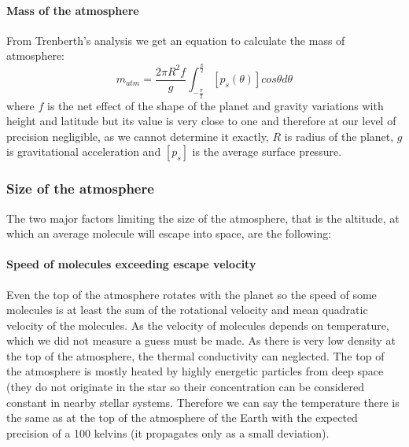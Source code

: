 \documentclass{cfp}
\begin{document}
\paragraph{Mass of the atmosphere}
From Trenberth's analysis \cite{Trenberth} we get an equation to calculate the mass of atmosphere:
\begin{equation}
m_{atm} = \frac{2\pi R^2 f}{g} \int_{-\frac{\pi}{2}}^{\frac{\pi}{2}} [p_s(\theta)]cos\theta d\theta
\end{equation}
where $f$ is the net effect of the shape of the planet and gravity variations with height and latitude but its value is very close to one and therefore at our level of precision negligible, as we cannot determine it exactly, $R$ is radius of the planet, $g$ is gravitational acceleration and $[p_s]$ is the average surface pressure. \subsubsection{Size of the atmosphere}
The two major factors limiting the size of the atmosphere, that is the altitude, at which an average molecule will escape into space, are the following:
\paragraph{Speed of molecules exceeding escape velocity} Even the top of the atmosphere rotates with the planet so the speed of some molecules is at least the sum of the rotational velocity and mean quadratic velocity of the molecules. As the velocity of molecules depends on temperature, which we did not measure a guess must be made. As there is very low density at the top of the atmosphere, the thermal conductivity can neglected. The top of the atmosphere is mostly heated by highly energetic particles from deep space (they do not originate in the star so their concentration can be considered constant in nearby stellar systems. Therefore we can say the temperature there is the same as at the top of the atmosphere of the Earth with the expected precision of a 100 kelvins (it propagates only as a small deviation).
\end{document}
